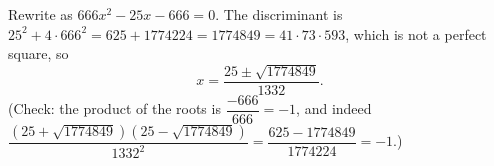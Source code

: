 Rewrite as $666x^2-25x-666=0$. The discriminant is $25^2+4\cdot666^2=625+1774224=1774849=41\cdot73\cdot593$, which is not a perfect square, so
\[x=\boxed{\dfrac{25\pm\sqrt{1774849}}{1332}}.\]
(Check: the product of the roots is $\dfrac{-666}{666}=-1$, and indeed $\dfrac{(25+\sqrt{1774849})(25-\sqrt{1774849})}{1332^2}=\dfrac{625-1774849}{1774224}=-1$.)
